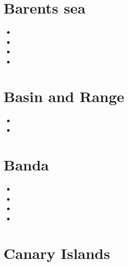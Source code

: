 \section{Barents sea}

\begin{small}
\begin{itemize}
\item[\twothousandseven]
\item[\twothousandthirteen]
\item[\twothousandfourteen]
\item[\twothousandfifteen]
\end{itemize}
\end{small}

\section{Basin and Range}

\begin{small}
\begin{itemize}
\item[\nineteeneightynine]
\item[\twothousandnine]
\end{itemize}
\end{small}

\section{Banda}

\begin{small}
\begin{itemize}
\item[\twothousandnine]
\item[\twothousandten]
\item[\twothousandtwentyone]
\item[\twothousandtwentytwo]
\end{itemize}
\end{small}


\section{Canary Islands}


